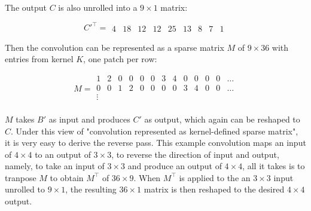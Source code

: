The output $C$ is also unrolled into a $9 \times 1$ matrix:

$$
C'^\intercal =
\begin{matrix}
  4 & 18 & 12 & 12 & 25 & 13 & 8 & 7 & 1
\end{matrix}
$$

Then the convolution can be represented as a sparse matrix $M$ of $9 \times 36$ with entries from kernel $K$,
one patch per row:

$$
M =
\begin{matrix}
  1 & 2 & 0 & 0 & 0 & 0 & 3 & 4 & 0 & 0 & 0 & 0 & \dots \\
  0 & 0 & 1 & 2 & 0 & 0 & 0 & 0 & 3 & 4 & 0 & 0 & \dots \\
  \vdots \\
\end{matrix}
$$

$M$ takes $B'$ as input and produces $C'$ as output, which again can be reshaped to $C$. Under this view of
"convolution represented as kernel-defined sparse matrix", it is very easy to derive the reverse pass.
This example convolution maps an input of $4 \times 4$ to an output of $3 \times 3$, to reverse the
direction of input and output, namely, to take an input of $3 \times 3$ and produce an output of $4 \times 4$,
all it takes is to tranpose $M$ to obtain $M^\intercal$ of $36 \times 9$. When $M^\intercal$ is applied to
the an $3 \times 3$ input unrolled to $9 \times 1$, the resulting $36 \times 1$ matrix is then reshaped to
the desired $4 \times 4$ output.

\clearpage %

